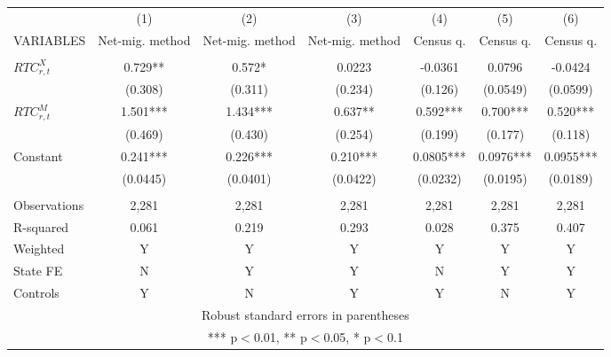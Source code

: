 \begin{tabular}{lcccccc} \hline
 & (1) & (2) & (3) & (4) & (5) & (6) \\
VARIABLES & Net-mig. method & Net-mig. method & Net-mig. method & Census q. & Census q. & Census q. \\ \hline
 &  &  &  &  &  &  \\
$ RTC_{r,t}^X$ & 0.729** & 0.572* & 0.0223 & -0.0361 & 0.0796 & -0.0424 \\
 & (0.308) & (0.311) & (0.234) & (0.126) & (0.0549) & (0.0599) \\
$ RTC_{r,t}^M$ & 1.501*** & 1.434*** & 0.637** & 0.592*** & 0.700*** & 0.520*** \\
 & (0.469) & (0.430) & (0.254) & (0.199) & (0.177) & (0.118) \\
Constant & 0.241*** & 0.226*** & 0.210*** & 0.0805*** & 0.0976*** & 0.0955*** \\
 & (0.0445) & (0.0401) & (0.0422) & (0.0232) & (0.0195) & (0.0189) \\
 &  &  &  &  &  &  \\
Observations & 2,281 & 2,281 & 2,281 & 2,281 & 2,281 & 2,281 \\
R-squared & 0.061 & 0.219 & 0.293 & 0.028 & 0.375 & 0.407 \\
Weighted & Y & Y & Y & Y & Y & Y \\
State FE & N & Y & Y & N & Y & Y \\
 Controls & Y & N & Y & Y & N & Y \\ \hline
\multicolumn{7}{c}{ Robust standard errors in parentheses} \\
\multicolumn{7}{c}{ *** p$<$0.01, ** p$<$0.05, * p$<$0.1} \\
\end{tabular}
